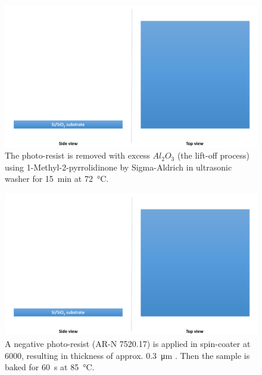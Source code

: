 \begin{multicols}{2}[]
    
    \begin{figure}[H]
        \centering
        \includegraphics[width=0.375\paperwidth, page=9]{img/04/Manufacturing_under.pdf}
        \caption{The photo-resist is removed with excess $Al_2O_3$ (the lift-off process) using 1-Methyl-2-pyrrolidinone by Sigma-Aldrich in ultrasonic washer for \SI{15}{\minute} at \SI{72}{\celsius}.}
        \label{FabricationBottomLiftOff}
    \end{figure}
    
    \begin{figure}[H]
        \centering
        \includegraphics[width=0.375\paperwidth, page=10]{img/04/Manufacturing_under.pdf}
        \caption{A negative photo-resist (AR-N 7520.17) is applied in spin-coater at \SI{6000}{\rpm}, resulting in thickness of approx. \SI{0.3}{\micro\meter} . Then the sample is baked for \SI{60}{\second} at \SI{85}{\celsius}.}
        \label{FabricationPillarResist}
    \end{figure}
    
\end{multicols}

